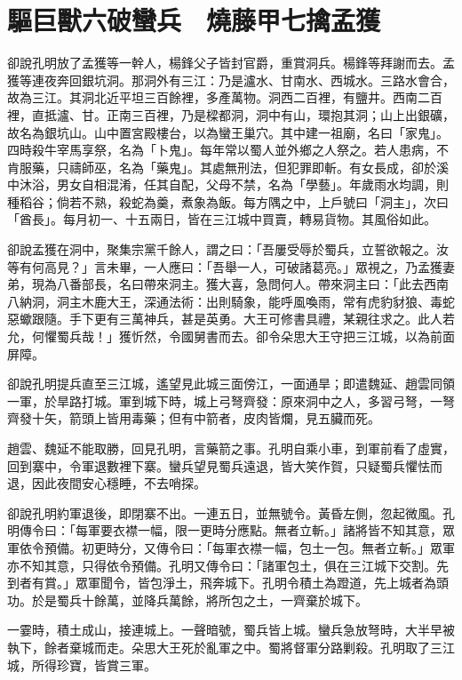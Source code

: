 
\chapter{驅巨獸六破蠻兵　燒藤甲七擒孟獲}

卻說孔明放了孟獲等一幹人，楊鋒父子皆封官爵，重賞洞兵。楊鋒等拜謝而去。孟獲等連夜奔回銀坑洞。那洞外有三江：乃是瀘水、甘南水、西城水。三路水會合，故為三江。其洞北近平坦三百餘裡，多產萬物。洞西二百裡，有鹽井。西南二百裡，直抵瀘、甘。正南三百裡，乃是樑都洞，洞中有山，環抱其洞；山上出銀礦，故名為銀坑山。山中置宮殿樓台，以為蠻王巢穴。其中建一祖廟，名曰「家鬼」。四時殺牛宰馬享祭，名為「卜鬼」。每年常以蜀人並外鄉之人祭之。若人患病，不肯服藥，只禱師巫，名為「藥鬼」。其處無刑法，但犯罪即斬。有女長成，卻於溪中沐浴，男女自相混淆，任其自配，父母不禁，名為「學藝」。年歲雨水均調，則種稻谷；倘若不熟，殺蛇為羹，煮象為飯。每方隅之中，上戶號曰「洞主」，次曰「酋長」。每月初一、十五兩日，皆在三江城中買賣，轉易貨物。其風俗如此。

卻說孟獲在洞中，聚集宗黨千餘人，謂之曰：「吾屢受辱於蜀兵，立誓欲報之。汝等有何高見？」言未畢，一人應曰：「吾舉一人，可破諸葛亮。」眾視之，乃孟獲妻弟，現為八番部長，名曰帶來洞主。獲大喜，急問何人。帶來洞主曰：「此去西南八納洞，洞主木鹿大王，深通法術：出則騎象，能呼風喚雨，常有虎豹豺狼、毒蛇惡蠍跟隨。手下更有三萬神兵，甚是英勇。大王可修書具禮，某親往求之。此人若允，何懼蜀兵哉！」獲忻然，令國舅書而去。卻令朵思大王守把三江城，以為前面屏障。

卻說孔明提兵直至三江城，遙望見此城三面傍江，一面通旱；即遣魏延、趙雲同領一軍，於旱路打城。軍到城下時，城上弓弩齊發：原來洞中之人，多習弓弩，一弩齊發十矢，箭頭上皆用毒藥；但有中箭者，皮肉皆爛，見五臟而死。

趙雲、魏延不能取勝，回見孔明，言藥箭之事。孔明自乘小車，到軍前看了虛實，回到寨中，令軍退數裡下寨。蠻兵望見蜀兵遠退，皆大笑作賀，只疑蜀兵懼怯而退，因此夜間安心穩睡，不去哨探。

卻說孔明約軍退後，即閉寨不出。一連五日，並無號令。黃昏左側，忽起微風。孔明傳令曰：「每軍要衣襟一幅，限一更時分應點。無者立斬。」諸將皆不知其意，眾軍依令預備。初更時分，又傳令曰：「每軍衣襟一幅，包土一包。無者立斬。」眾軍亦不知其意，只得依令預備。孔明又傳令曰：「諸軍包土，俱在三江城下交割。先到者有賞。」眾軍聞令，皆包淨土，飛奔城下。孔明令積土為蹬道，先上城者為頭功。於是蜀兵十餘萬，並降兵萬餘，將所包之土，一齊棄於城下。

一霎時，積土成山，接連城上。一聲暗號，蜀兵皆上城。蠻兵急放弩時，大半早被執下，餘者棄城而走。朵思大王死於亂軍之中。蜀將督軍分路剿殺。孔明取了三江城，所得珍寶，皆賞三軍。

